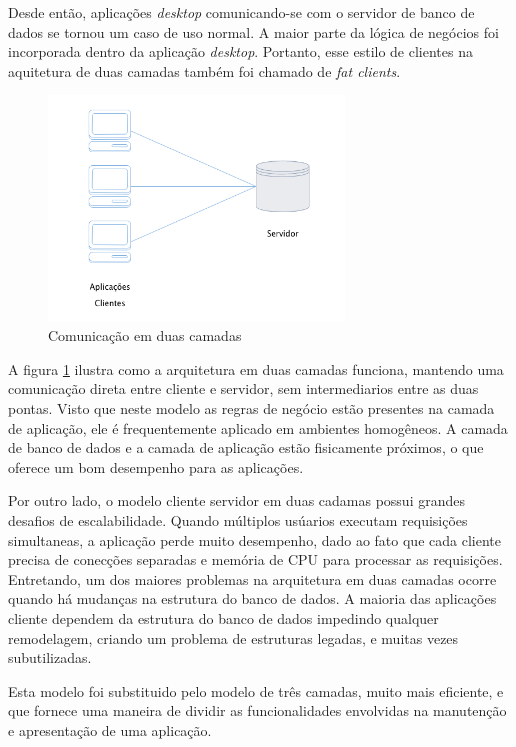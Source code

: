 Desde então, aplicações \textit{desktop} comunicando-se com o servidor de banco de dados se tornou um caso de uso normal. A maior parte da lógica de negócios foi incorporada dentro da aplicação \textit{desktop}. Portanto, esse estilo de clientes na aquitetura de duas camadas também foi chamado de \textit{fat clients}.

\begin{figure}[htbp]
    \centering
    \includegraphics[width=0.7\textwidth]{figuras/client-server.png}
    \caption{Comunicação em duas camadas}
    \label{fig:two-tier}
\end{figure}

A figura \ref{fig:two-tier} ilustra como a arquitetura em duas camadas funciona, mantendo uma comunicação direta entre cliente e servidor, sem intermediarios entre as duas pontas. Visto que neste modelo as regras de negócio estão presentes na camada de aplicação, ele é frequentemente aplicado em ambientes homogêneos. A camada de banco de dados e a camada de aplicação estão fisicamente próximos, o que oferece um bom desempenho para as aplicações.

Por outro lado, o modelo cliente servidor em duas cadamas possui grandes desafios de escalabilidade. Quando múltiplos usúarios executam requisições simultaneas, a aplicação perde muito desempenho, dado ao fato que cada cliente precisa de conecções separadas e memória de CPU para processar as requisições. Entretando, um dos maiores problemas na arquitetura em duas camadas ocorre quando há mudanças na estrutura do banco de dados. A maioria das aplicações cliente dependem da estrutura do banco de dados impedindo qualquer remodelagem, criando um problema de estruturas legadas, e muitas vezes subutilizadas.

Esta modelo foi substituido pelo modelo de três camadas, muito mais eficiente, e que fornece uma maneira de dividir as funcionalidades envolvidas na manutenção e apresentação de uma aplicação.

